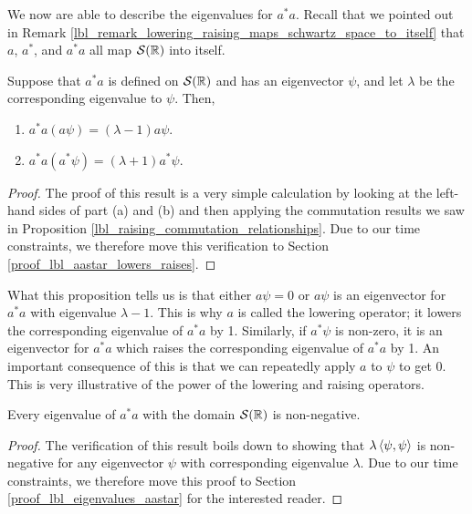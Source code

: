 We now are able to describe the eigenvalues for $a^*a$. Recall that we pointed out in Remark \eqref{lbl_remark_lowering_raising_maps_schwartz_space_to_itself} that $a$, $a^*$, and $a^*a$ all map $\mathcal{S}(\mathbb{R})$ into itself.
\begin{proposition}\label{lbl_aastar_lowers_raises}
  Suppose that $a^*a$ is defined on $\mathcal{S}(\mathbb{R})$ and has an eigenvector $\psi$, and let $\lambda$ be the corresponding eigenvalue to $\psi$. Then,
  \begin{enumerate}[label=(\alph*)]
    \item $a^*a (a\psi) = (\lambda - 1)a\psi$.
    \item $a^*a (a^* \psi) = (\lambda + 1)a^*\psi$.
  \end{enumerate}
\end{proposition}
\begin{proof}
    The proof of this result is a very simple calculation by looking at the left-hand sides of part (a) and (b) and then applying the commutation results we saw in Proposition \eqref{lbl_raising_commutation_relationships}. Due to our time constraints, we therefore move this verification to Section \eqref{proof_lbl_aastar_lowers_raises}.
\end{proof}
\begin{remark}
  What this proposition tells us is that either $a \psi = 0$ or $a \psi$ is an eigenvector for $a^*a$ with eigenvalue $\lambda - 1$. This is why $a$ is called the lowering operator; it lowers the corresponding eigenvalue of $a^*a$ by 1. Similarly, if $a^*\psi$ is non-zero, it is an eigenvector for $a^*a$ which raises the corresponding eigenvalue of $a^*a$ by 1. An important consequence of this is that we can repeatedly apply $a$ to $\psi$ to get 0. This is very illustrative of the power of the lowering and raising operators.
\end{remark}
\begin{lemma}\label{lbl_eigenvalues_aastar}
  Every eigenvalue of $a^*a$ with the domain $\mathcal{S}(\mathbb{R})$ is non-negative.
\end{lemma}
\begin{proof}
  The verification of this result boils down to showing that $\lambda\left\langle \psi, \psi\right\rangle$ is non-negative for any eigenvector $\psi$ with corresponding eigenvalue $\lambda$.  Due to our time constraints, we therefore move this proof to Section \eqref{proof_lbl_eigenvalues_aastar} for the interested reader.
\end{proof}
